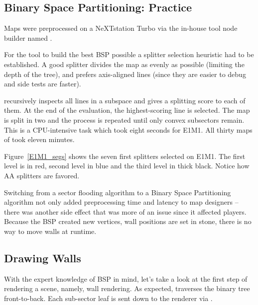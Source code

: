 \subsection{Binary Space Partitioning: Practice}
Maps were preprocessed on a NeXTstation Turbo via the in-house tool node builder named .\\
\par
For the tool to build the best BSP possible a splitter selection heuristic had to be established. A good splitter divides the map as evenly as possible (limiting the depth of the tree), and prefers axis-aligned lines (since they are easier to debug and side tests are faster).\\
\par
  recursively inspects all lines in a subspace and gives a splitting score to each of them. At the end of the evaluation, the highest-scoring line is selected. The map is split in two and the process is repeated until only convex subsectors remain. This is a CPU-intensive task which took eight seconds for E1M1. All thirty maps of  took eleven minutes.\\
\par
{}
\par
Figure~\ref{E1M1_segs} shows the seven first splitters selected on E1M1. The first level is in red, second level in blue and the third level in thick black. Notice how AA splitters are favored.\\
\par
Switching from a sector flooding algorithm to a Binary Space Partitioning algorithm not only added preprocessing time and latency to map designers -- there was another side effect that was more of an issue since it affected players. Because the BSP created new vertices, wall positions are set in stone, there is no way to move walls at runtime.

\vspace{5pt}

\par


\subsection{Drawing Walls}
With the expert knowledge of BSP in mind, let's take a look at the first step of rendering a scene, namely, wall rendering. As expected,  traverses the binary tree front-to-back. Each sub-sector leaf is sent down to the renderer via .\\
\par
{}
\par


